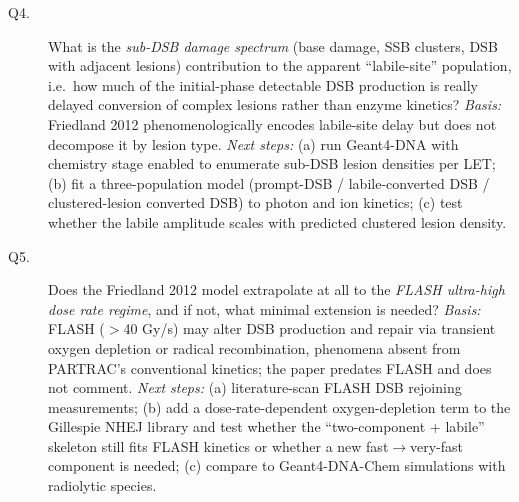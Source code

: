 \documentclass[11pt]{article}
\begin{document}
\begin{description}
\item[Q4.] What is the \emph{sub-DSB damage spectrum} (base damage, SSB
clusters, DSB with adjacent lesions) contribution to the apparent
``labile-site'' population, i.e.\ how much of the initial-phase detectable
DSB production is really delayed conversion of complex lesions rather than
enzyme kinetics? \emph{Basis:} Friedland 2012 phenomenologically encodes
labile-site delay but does not decompose it by lesion type. \emph{Next
steps:} (a) run Geant4-DNA with chemistry stage enabled to enumerate
sub-DSB lesion densities per LET; (b) fit a three-population model
(prompt-DSB / labile-converted DSB / clustered-lesion converted DSB) to
photon and ion kinetics; (c) test whether the labile amplitude scales with
predicted clustered lesion density.

\item[Q5.] Does the Friedland 2012 model extrapolate at all to the
\emph{FLASH ultra-high dose rate regime}, and if not, what minimal
extension is needed? \emph{Basis:} FLASH ($>$40 Gy/s) may alter DSB
production and repair via transient oxygen depletion or radical
recombination, phenomena absent from PARTRAC's conventional kinetics; the
paper predates FLASH and does not comment. \emph{Next steps:} (a)
literature-scan FLASH DSB rejoining measurements; (b) add a
dose-rate-dependent oxygen-depletion term to the Gillespie NHEJ library
and test whether the ``two-component + labile'' skeleton still fits FLASH
kinetics or whether a new fast$\to$very-fast component is needed; (c)
compare to Geant4-DNA-Chem simulations with radiolytic species.
\end{description}
\end{document}
